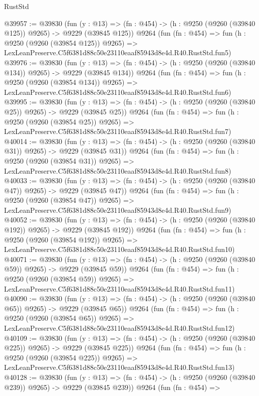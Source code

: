 \begin{lexlean}{RustStd}
\begin{coremodule}
@39957 := @39830
    (fun (y : @13) => (fn : @454) -> (h : @9250 (@9260 (@39840 @125)) @9265) -> @9229 (@39845 @125))
    @9264
    (fun (fn : @454) =>
    fun (h : @9250 (@9260 (@39854 @125)) @9265) =>
    LexLeanPreserve.C5f6381d88c50e23110eaaf85943d8e4d.R40.RustStd.fun5)
@39976 := @39830
    (fun (y : @13) => (fn : @454) -> (h : @9250 (@9260 (@39840 @134)) @9265) -> @9229 (@39845 @134))
    @9264
    (fun (fn : @454) =>
    fun (h : @9250 (@9260 (@39854 @134)) @9265) =>
    LexLeanPreserve.C5f6381d88c50e23110eaaf85943d8e4d.R40.RustStd.fun6)
@39995 := @39830
    (fun (y : @13) => (fn : @454) -> (h : @9250 (@9260 (@39840 @25)) @9265) -> @9229 (@39845 @25))
    @9264
    (fun (fn : @454) =>
    fun (h : @9250 (@9260 (@39854 @25)) @9265) =>
    LexLeanPreserve.C5f6381d88c50e23110eaaf85943d8e4d.R40.RustStd.fun7)
@40014 := @39830
    (fun (y : @13) => (fn : @454) -> (h : @9250 (@9260 (@39840 @31)) @9265) -> @9229 (@39845 @31))
    @9264
    (fun (fn : @454) =>
    fun (h : @9250 (@9260 (@39854 @31)) @9265) =>
    LexLeanPreserve.C5f6381d88c50e23110eaaf85943d8e4d.R40.RustStd.fun8)
@40033 := @39830
    (fun (y : @13) => (fn : @454) -> (h : @9250 (@9260 (@39840 @47)) @9265) -> @9229 (@39845 @47))
    @9264
    (fun (fn : @454) =>
    fun (h : @9250 (@9260 (@39854 @47)) @9265) =>
    LexLeanPreserve.C5f6381d88c50e23110eaaf85943d8e4d.R40.RustStd.fun9)
@40052 := @39830
    (fun (y : @13) => (fn : @454) -> (h : @9250 (@9260 (@39840 @192)) @9265) -> @9229 (@39845 @192))
    @9264
    (fun (fn : @454) =>
    fun (h : @9250 (@9260 (@39854 @192)) @9265) =>
    LexLeanPreserve.C5f6381d88c50e23110eaaf85943d8e4d.R40.RustStd.fun10)
@40071 := @39830
    (fun (y : @13) => (fn : @454) -> (h : @9250 (@9260 (@39840 @59)) @9265) -> @9229 (@39845 @59))
    @9264
    (fun (fn : @454) =>
    fun (h : @9250 (@9260 (@39854 @59)) @9265) =>
    LexLeanPreserve.C5f6381d88c50e23110eaaf85943d8e4d.R40.RustStd.fun11)
@40090 := @39830
    (fun (y : @13) => (fn : @454) -> (h : @9250 (@9260 (@39840 @65)) @9265) -> @9229 (@39845 @65))
    @9264
    (fun (fn : @454) =>
    fun (h : @9250 (@9260 (@39854 @65)) @9265) =>
    LexLeanPreserve.C5f6381d88c50e23110eaaf85943d8e4d.R40.RustStd.fun12)
@40109 := @39830
    (fun (y : @13) => (fn : @454) -> (h : @9250 (@9260 (@39840 @225)) @9265) -> @9229 (@39845 @225))
    @9264
    (fun (fn : @454) =>
    fun (h : @9250 (@9260 (@39854 @225)) @9265) =>
    LexLeanPreserve.C5f6381d88c50e23110eaaf85943d8e4d.R40.RustStd.fun13)
@40128 := @39830
    (fun (y : @13) => (fn : @454) -> (h : @9250 (@9260 (@39840 @239)) @9265) -> @9229 (@39845 @239))
    @9264
    (fun (fn : @454) =>

\end{coremodule}
\end{lexlean}
